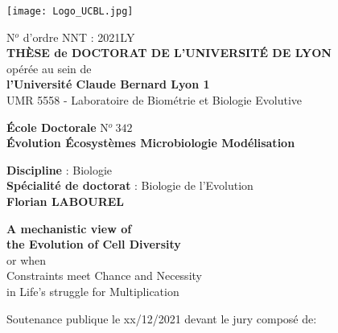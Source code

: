 \begin{titlepage}
\centering
\vspace*{-2cm}

\begin{center}
	\begin{minipage}[c]{\linewidth}
    \centering
        \texttt{[image: Logo\_UCBL.jpg]}
	\end{minipage}\hfill
\end{center}

\begin{center}
    \vspace{-0.2cm}
    \small N$^o$ d'ordre NNT : 2021LY\\
	\vspace{0.4cm}
	\large \textbf{THÈSE de DOCTORAT DE L'UNIVERSITÉ DE LYON}\\
	\normalsize opérée au sein de\\
	\textbf{l'Université Claude Bernard Lyon 1}\\
	\vspace{-0.3cm}
	UMR 5558 - Laboratoire de Biométrie et Biologie Evolutive\\
    \begin{center}
		\textbf{École Doctorale} N$^o~342$ \\
		\vspace{-0.3cm}
		\textbf{Évolution Écosystèmes Microbiologie Modélisation}
    \end{center}
    \textbf{Discipline} : Biologie \\
    \textbf{Spécialité de doctorat} : Biologie de l'Evolution\\
    
        \Large \textbf{Florian LABOUREL}
        \vspace{0.75cm}
        \hline
        \begin{center}
        \vspace{0.25cm}
				\Large \textbf{A mechanistic view of}\\
				\Large \textbf{the Evolution of Cell Diversity}\\
				\vspace{0.25cm}
				\normalsize or when\\
				\vspace{0.25cm}
				\large
				Constraints meet Chance and Necessity \normalsize\\
				\vspace{0cm}
				\large in Life's struggle for Multiplication\\
    \end{center}
    \vspace{0.25cm}
    \hline
	\vspace{1cm}
    \normalsize Soutenance publique le xx/12/2021 devant le jury composé de:\\
\end{center}


\end{titlepage}
